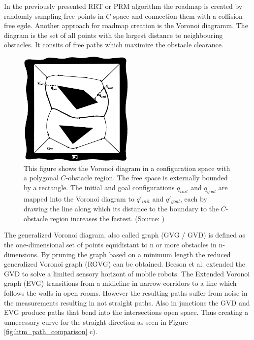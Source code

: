 In the previously presented RRT or PRM algorithm the roadmap is created by randomly sampling free points in \(C\)-space and connection them with a collision free egde. Another approach for roadmap creation is the Voronoi diagramm. The diagram is the set of all points with the largest distance to neighbouring obstacles. It consits of free paths which maximize the obstacle clearance.

\begin{figure}[h]
    \centering
    \includegraphics[width=0.5\textwidth]{figures/20_state_of_the_art/voronoi_diagram.png}
    \caption[The Voronoi diagram]{This figure shows the Voronoi diagram in a configuration space with a polygonal \(C\)-obstacle region. The free space is externally bounded by a rectangle. The initial and goal configurations \(q_{init}\) and \(q_{goal}\) are mapped into the Voronoi diagram to \(q'_{init}\) and \(q'_{goal}\), each by drawing the line along which its distance to the boundary to the \(C\)-obstacle region increases the fastest. (Source: \cite{latombe_robot_2003})}
    \label{fig:voronoi_diagram}
\end{figure}

The generalized Voronoi diagram, also called graph (GVG / GVD) is defined as the one-dimensional set of points equidistant to n or more obstacles in n-dimensions. By pruning the graph based on a minimum length the reduced generalized Voronoi graph (RGVG) can be obtained. Beeson et al. \cite{beeson_towards_2005} extended the GVD to solve a limited sensory horizont of mobile robots. The Extended Voronoi graph (EVG) transitions from a midleline in narrow corridors to a line which follows the walls in open rooms.  However the resulting paths suffer from noise in the measurements resulting in not straight paths. Also in junctions the GVD and EVG produce paths that bend into the intersections open space. Thus creating a unnecessary curve for the straight direction as seen in Figure \ref{fig:htm_path_comparison} c).

